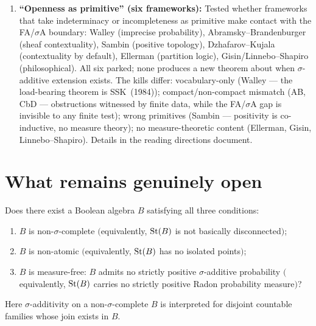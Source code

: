 \begin{enumerate}
  \item \textbf{``Openness as primitive'' (six frameworks):}
    Tested whether frameworks that take indeterminacy or
    incompleteness as primitive make contact with the FA/$\sigma$A
    boundary: Walley (imprecise probability), Abramsky--Brandenburger
    (sheaf contextuality), Sambin (positive topology),
    Dzhafarov--Kujala (contextuality by default), Ellerman (partition
    logic), Gisin/Linnebo--Shapiro (philosophical).  All six parked;
    none produces a new theorem about when $\sigma$-additive extension
    exists.  The kills differ: vocabulary-only (Walley --- the
    load-bearing theorem is SSK~(1984)); compact/non-compact mismatch
    (AB, CbD --- obstructions witnessed by finite data, while the
    FA/$\sigma$A gap is invisible to any finite test); wrong
    primitives (Sambin --- positivity is co-inductive, no measure
    theory); no measure-theoretic content (Ellerman, Gisin,
    Linnebo--Shapiro).  Details in the reading directions document.
\end{enumerate}

\section{What remains genuinely open}
\label{sec:open}


\begin{openproblem}
\label{op:strategy-d}
Does there exist a Boolean algebra $B$ satisfying all three conditions:
\begin{enumerate}[label=(\roman*)]
  \item $B$ is non-$\sigma$-complete
    $($equivalently, $\mathrm{St}(B)$ is not basically disconnected$)$;
  \item $B$ is non-atomic
    $($equivalently, $\mathrm{St}(B)$ has no isolated points$)$;
  \item $B$ is measure-free: $B$ admits no strictly positive
    $\sigma$-additive probability
    $($equivalently, $\mathrm{St}(B)$ carries no strictly positive Radon
    probability measure$)$?
\end{enumerate}
Here $\sigma$-additivity on a non-$\sigma$-complete $B$ is
interpreted for disjoint countable families whose join exists in $B$.
\end{openproblem}

